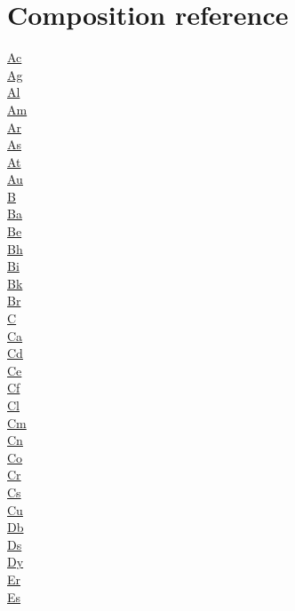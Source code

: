 \chapter{Composition reference}
\begin{multicols}{3}
\noindent
\hyperref[sec:elem-actinium]{Ac}\\
\hyperref[sec:elem-silver]{Ag}\\
\hyperref[sec:elem-aluminium]{Al}\\
\hyperref[sec:elem-americium]{Am}\\
\hyperref[sec:elem-argon]{Ar}\\
\hyperref[sec:elem-arsenic]{As}\\
\hyperref[sec:elem-astatine]{At}\\
\hyperref[sec:elem-gold]{Au}\\
\hyperref[sec:elem-boron]{B}\\
\hyperref[sec:elem-barium]{Ba}\\
\hyperref[sec:elem-beryllium]{Be}\\
\hyperref[sec:elem-bohrium]{Bh}\\
\hyperref[sec:elem-bismuth]{Bi}\\
\hyperref[sec:elem-berkelium]{Bk}\\
\hyperref[sec:elem-bromine]{Br}\\
\hyperref[sec:elem-carbon]{C}\\
\hyperref[sec:elem-calcium]{Ca}\\
\hyperref[sec:elem-cadmium]{Cd}\\
\hyperref[sec:elem-cerium]{Ce}\\
\hyperref[sec:elem-californium]{Cf}\\
\hyperref[sec:elem-chlorine]{Cl}\\
\hyperref[sec:elem-curium]{Cm}\\
\hyperref[sec:elem-copernicium]{Cn}\\
\hyperref[sec:elem-cobalt]{Co}\\
\hyperref[sec:elem-chromium]{Cr}\\
\hyperref[sec:elem-caesium]{Cs}\\
\hyperref[sec:elem-copper]{Cu}\\
\hyperref[sec:elem-dubnium]{Db}\\
\hyperref[sec:elem-darmstadtium]{Ds}\\
\hyperref[sec:elem-dysprosium]{Dy}\\
\hyperref[sec:elem-erbium]{Er}\\
\hyperref[sec:elem-einsteinium]{Es}\\

\end{multicols}
